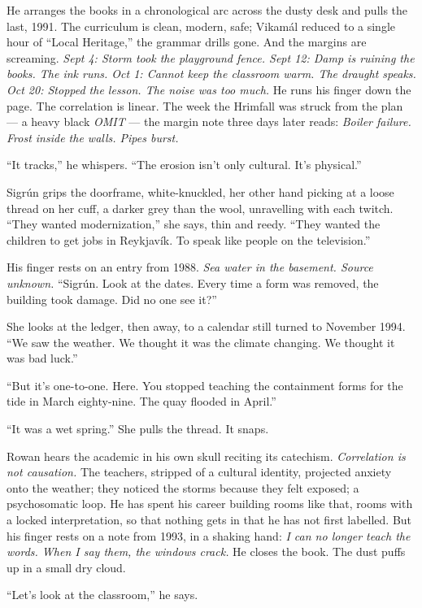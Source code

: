 \documentclass[11pt,oneside]{book}
\begin{document}
He arranges the books in a chronological arc across the dusty desk and
pulls the last, 1991. The curriculum is clean, modern, safe; Vikamál
reduced to a single hour of ``Local Heritage,'' the grammar drills gone.
And the margins are screaming. \emph{Sept 4: Storm took the playground
fence. Sept 12: Damp is ruining the books. The ink runs. Oct 1: Cannot
keep the classroom warm. The draught speaks. Oct 20: Stopped the lesson.
The noise was too much.} He runs his finger down the page. The
correlation is linear. The week the Hrimfall was struck from the plan
--- a heavy black \emph{OMIT} --- the margin note three days later
reads: \emph{Boiler failure. Frost inside the walls. Pipes burst.}

``It tracks,'' he whispers. ``The erosion isn't only cultural. It's
physical.''

Sigrún grips the doorframe, white-knuckled, her other hand picking at a
loose thread on her cuff, a darker grey than the wool, unravelling with
each twitch. ``They wanted modernization,'' she says, thin and reedy.
``They wanted the children to get jobs in Reykjavík. To speak like
people on the television.''

His finger rests on an entry from 1988. \emph{Sea water in the basement.
Source unknown.} ``Sigrún. Look at the dates. Every time a form was
removed, the building took damage. Did no one see it?''

She looks at the ledger, then away, to a calendar still turned to
November 1994. ``We saw the weather. We thought it was the climate
changing. We thought it was bad luck.''

``But it's one-to-one. Here. You stopped teaching the containment forms
for the tide in March eighty-nine. The quay flooded in April.''

``It was a wet spring.'' She pulls the thread. It snaps.

Rowan hears the academic in his own skull reciting its catechism.
\emph{Correlation is not causation.} The teachers, stripped of a
cultural identity, projected anxiety onto the weather; they noticed the
storms because they felt exposed; a psychosomatic loop. He has spent his
career building rooms like that, rooms with a locked interpretation, so
that nothing gets in that he has not first labelled. But his finger
rests on a note from 1993, in a shaking hand: \emph{I can no longer
teach the words. When I say them, the windows crack.} He closes the
book. The dust puffs up in a small dry cloud.

``Let's look at the classroom,'' he says.
\end{document}
